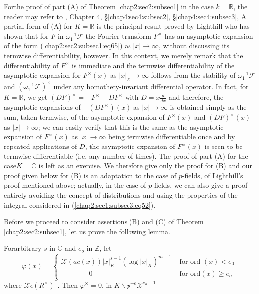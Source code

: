 \begin{Remarks*}
 For\pageoriginale the proof of part (A) of Theorem \ref{chap2:sec2:subsec1} in the case
 $k=\mathbb{R}$, the reader may refer to \cite{Lig}, Chapter 4,
 \S \ref{chap4:sec4:subsec2}, \S \ref{chap4:sec4:subsec3}, A partial
 form of (A) for 
 $K=\mathbb{R}$ is the principal result proved by Lighthill who has
 shown that for $F$ in $\omega_{1}^{-1}\mathscr{F}$ the Fourier
 transform $F^{\times}$ has an asymptotic expansion of the form
 (\ref{chap2:sec2:subsec1:eq65})
 as $|x|\rightarrow \infty$, without discussing its termwise
 differentiability, however. In this context, we merely remark that
 the differentiability of $F^{\times}$ is immediate and the termwise
 differentiability of the asymptotic expansion for $F^{\times}(x)$ as
 $|x|_{K}\rightarrow \infty$ follows from the stability of
 $\omega_{1}^{-1}\mathscr{F}$ and
 $(\omega_{1}^{-1}\mathscr{F})^{\times}$ under any homothety-invariant
 differential operator. In fact, for $K=\mathbb{R}$, we get
 $(DF)^{\times}={-F}^{\times}-DF^{\times}$ with $D=x\frac{d}{dx}$ and
 therefore, the asymptotic expansions of $-(DF^{\times})(x)$ as
 $|x|\rightarrow \infty$ is obtained simply as the sum, taken
 termwise, of the asymptotic expansion of $F^{\times}(x)$ and
 $(DF)^{\times}(x)$ as $|x|\rightarrow \infty$; we can easily verify
 that this is the same as the asymptotic expansion of $F^{\times}(x)$ as
 $|x|\rightarrow \infty$ being termwise differentiable once and by
 repeated applications of $D$, the asymptotic expansion of
 $F^{\times}(x)$ is seen to be termwise differentiable (i.e, any number
 of times). The proof of part (A) for the case$K=\mathbb{C}$ is left
 as an exercise. We therefore give only the proof for (B) and our
 proof given below for (B) is an adaptation to the case of $p$-fields,
 of Lighthill's proof mentioned above; actually, in the case of
 $p$-fields, we can also give a proof entirely avoiding the concept of
 distributions and using the properties of the integral considered in
 (\ref{chap2:sec1:subsec3:eq52}).
 
 Before we proceed to consider assertions (B) and (C) of
 Theorem \ref{chap2:sec2:subsec1},
 let us prove the following lemma.
\end{Remarks*}

\begin{lemma}\label{chap2:sec2:subsec1:lem1} %
  For\pageoriginale arbitrary $s$ in $\mathbb{C}$ and $e_{o}$ in
  $\mathbb{Z}$, let 
  \begin{equation*}
    \varphi(x)=
    \begin{cases}
      \mathcal{X}(ac(x))|x|_{K}^{s-1}(\log |x|_{K})^{m-1}
      & \text{ for ord }(x)<e_{0}\\
      \qquad\qquad 0 & \text{ for ord}(x)\ge e_{o}
    \end{cases}
  \end{equation*}
  where $\mathcal{X}\epsilon (R^{\times})^{\ast}$. Then
  $\varphi^{\times}=0$, in $K\backslash p^{-e}\mathcal{X}^{e_{o}+1}$
\end{lemma}

